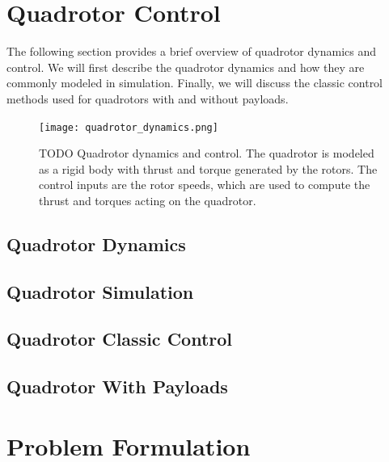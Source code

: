 \section{Quadrotor Control}
The following section provides a brief overview of quadrotor dynamics and control. We will first describe the quadrotor dynamics and how they are commonly modeled in simulation. Finally, we will discuss the classic control methods used for quadrotors with and without payloads.
\begin{figure}
\centering
\texttt{[image: quadrotor\_dynamics.png]}
\caption{TODO Quadrotor dynamics and control. The quadrotor is modeled as a rigid body with thrust and torque generated by the rotors. The control inputs are the rotor speeds, which are used to compute the thrust and torques acting on the quadrotor.}
\end{figure}
\subsection{Quadrotor Dynamics}
\subsection{Quadrotor Simulation}
\subsection{Quadrotor Classic Control}
\subsection{Quadrotor With Payloads}

\section{Problem Formulation}




